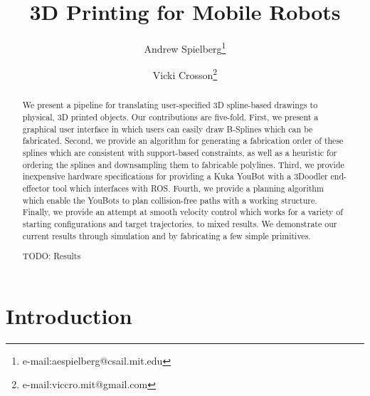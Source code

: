 \documentclass[conference]{acmsiggraph}
\title{3D Printing for Mobile Robots}
\author{Andrew Spielberg\thanks{e-mail:aespielberg@csail.mit.edu} \and Vicki Crosson\thanks{e-mail:viccro.mit@gmail.com}}
\begin{document}

\maketitle

\begin{abstract}
We present a pipeline for translating user-specified 3D spline-based drawings to physical, 3D printed objects.  Our contributions are five-fold.  First, we present a graphical user interface in which users can easily draw B-Splines which can be fabricated.  Second, we provide an algorithm for generating a fabrication order of these splines which are consistent with support-based constraints, as well as a heuristic for ordering the splines and downsampling them to fabricable polylines.  Third, we provide inexpensive hardware specifications for providing a Kuka YouBot with a 3Doodler end-effector tool which interfaces with ROS.  Fourth, we provide a planning algorithm which enable the YouBots to plan collision-free paths with a working structure.  Finally, we provide an attempt at smooth velocity control which works for a variety of starting configurations and target trajectories, to mixed results.  We demonstrate our current results through simulation and by fabricating a few simple primitives.

TODO: Results




\end{abstract}


\keywordlist


\TOGlinkslist


\copyrightspace

\section{Introduction}
\end{document}
